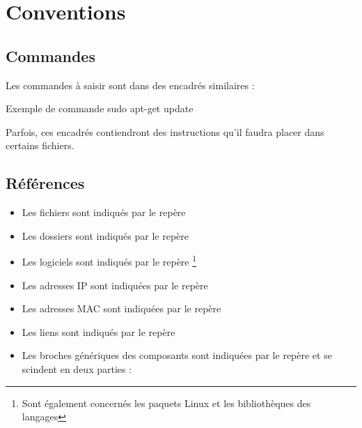 \section{Conventions}
\subsection*{Commandes}
Les commandes à saisir sont dans des encadrés similaires : \\

\begin{Bash}{Exemple de commande}
sudo apt-get update
\end{Bash}

Parfois, ces encadrés contiendront des instructions qu'il faudra placer dans certains fichiers.


\subsection*{Références}

\begin{itemize}
    \item Les fichiers sont indiqués par le repère 
    \item Les dossiers sont indiqués par le repère 
    \item Les logiciels sont indiqués par le repère \footnote{Sont également concernés les paquets Linux et les bibliothèques des langages}
    \item Les adresses IP sont indiquées par le repère  
    \item Les adresses MAC sont indiquées par le repère  
    \item Les liens sont indiqués par le repère 
    \item Les broches génériques des composants sont indiquées par le repère  et se scindent en deux parties :
\end{itemize}

